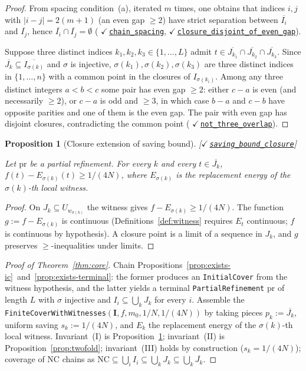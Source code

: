 \documentclass[11pt,reqno]{amsart}
\newtheorem{proposition}[theorem]{Proposition}
\theoremstyle{definition}
\newcommand{\unit}{\mathbf{I}}
\newcommand{\NC}{\mathrm{NC}}
\newcommand{\leanrepo}{https://github.com/MathNetwork/comb_arg/blob/v0.1.0/CombArg}
\newcommand{\lean}[2]{{\normalfont\color{leangreen}%
  \ensuremath{\checkmark}\,\href{\leanrepo/#2}{\texttt{#1}}}}
\newcommand{\leanmargin}[2]{%
  \nopagebreak\hfill{\normalfont\small\color{leangreen}%
    [\ensuremath{\checkmark}\,\href{\leanrepo/#2}{\texttt{#1}}]}\par\nopagebreak
}
\begin{document}
\begin{proof}
From spacing condition~(a), iterated $m$ times, one obtains
that indices $i, j$ with $|i - j| = 2(m+1)$ (an even gap $\ge
2$) have strict separation between $\overline{I_i}$ and
$\overline{I_j}$, hence
$\overline{I_i} \cap \overline{I_j} = \emptyset$
(\lean{chain\_spacing}{Refinement/Disjointness.lean},
\lean{closure\_disjoint\_of\_even\_gap}{Refinement/Disjointness.lean}).

Suppose three distinct indices $k_1, k_2, k_3 \in \{1,\ldots,L\}$
admit $t \in \overline{J_{k_1}} \cap \overline{J_{k_2}} \cap
\overline{J_{k_3}}$. Since $\overline{J_k} \subseteq
\overline{I_{\sigma(k)}}$ and $\sigma$ is injective,
$\sigma(k_1), \sigma(k_2), \sigma(k_3)$ are three distinct
indices in $\{1,\ldots,n\}$ with a common point in the
closures of $I_{\sigma(k_i)}$. Among any three distinct
integers $a < b < c$ some pair has even gap $\ge 2$: either
$c - a$ is even (and necessarily $\ge 2$), or $c - a$ is odd
and $\ge 3$, in which case $b - a$ and $c - b$ have opposite
parities and one of them is the even gap. The pair with even
gap has disjoint closures, contradicting the common point
(\lean{not\_three\_overlap}{Refinement/Disjointness.lean}).
\end{proof}

\begin{proposition}[Closure extension of saving bound]
\label{prop:saving-bound}
\leanmargin{saving\_bound\_closure}{Refinement/Assembly.lean}
Let $\mathrm{pr}$ be a partial refinement. For every $k$ and
every $t \in \overline{J_k}$,
$f(t) - E_{\sigma(k)}(t) \ge 1/(4N)$, where
$E_{\sigma(k)}$ is the replacement energy of the $\sigma(k)$-th
local witness.
\end{proposition}

\begin{proof}
On $J_k \subseteq U_{w_{\sigma(k)}}$ the witness gives
$f - E_{\sigma(k)} \ge 1/(4N)$. The function
$g := f - E_{\sigma(k)}$ is continuous
(Definitions~\ref{def:witness} requires $E_t$ continuous;
$f$ is continuous by hypothesis). A closure point is a limit of
a sequence in $J_k$, and $g$ preserves $\ge$-inequalities under
limits.
\end{proof}

\begin{proof}[Proof of Theorem~\ref{thm:core}]
Chain Propositions~\ref{prop:exists-ic}~and~\ref{prop:exists-terminal}:
the former produces an \texttt{InitialCover} from the witness
hypothesis, and the latter yields a terminal
\texttt{PartialRefinement} $\mathrm{pr}$ of length $L$ with
$\sigma$ injective and $I_i \subseteq \bigcup_k J_k$ for every
$i$. Assemble the
\texttt{FiniteCoverWithWitnesses}$(\unit, f, m_0, 1/N, 1/(4N))$
by taking pieces $p_k := \overline{J_k}$, uniform saving
$s_k := 1/(4N)$, and $E_k$ the replacement energy of the
$\sigma(k)$-th local witness. Invariant~(I) is
Proposition~\ref{prop:saving-bound}; invariant~(II) is
Proposition~\ref{prop:twofold}; invariant~(III) holds by
construction ($s_k = 1/(4N)$); coverage of $\NC$ chains as
$\NC \subseteq \bigcup_i I_i \subseteq \bigcup_k J_k \subseteq
\bigcup_k \overline{J_k}$.
\end{proof}
\end{document}
